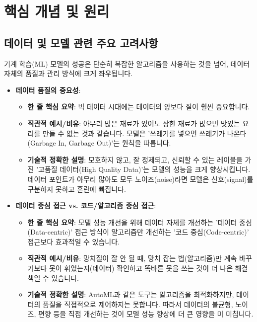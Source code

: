 \documentclass[11pt,a4paper]{article}
\begin{document}
\newpage
\section*{핵심 개념 및 원리}

\subsection*{데이터 및 모델 관련 주요 고려사항}

기계 학습(ML) 모델의 성공은 단순히 복잡한 알고리즘을 사용하는 것을 넘어, 데이터 자체의 품질과 관리 방식에 크게 좌우됩니다.

\begin{itemize}
    \item \textbf{데이터 품질의 중요성}:
    \begin{itemize}
        \item \textbf{한 줄 핵심 요약}: 빅 데이터 시대에는 데이터의 양보다 질이 훨씬 중요합니다.
        \item \textbf{직관적 예시/비유}: 아무리 많은 재료가 있어도 상한 재료가 많으면 맛있는 요리를 만들 수 없는 것과 같습니다. 모델은 '쓰레기를 넣으면 쓰레기가 나온다(Garbage In, Garbage Out)'는 원칙을 따릅니다.
        \item \textbf{기술적 정확한 설명}: 모호하지 않고, 잘 정제되고, 신뢰할 수 있는 레이블을 가진 '고품질 데이터(High Quality Data)'는 모델의 성능을 크게 향상시킵니다. 데이터 포인트가 아무리 많아도 모두 노이즈(noise)라면 모델은 신호(signal)를 구분하지 못하고 혼란에 빠집니다.
    \end{itemize}

    \item \textbf{데이터 중심 접근 vs. 코드/알고리즘 중심 접근}:
    \begin{itemize}
        \item \textbf{한 줄 핵심 요약}: 모델 성능 개선을 위해 데이터 자체를 개선하는 '데이터 중심(Data-centric)' 접근 방식이 알고리즘만 개선하는 '코드 중심(Code-centric)' 접근보다 효과적일 수 있습니다.
        \item \textbf{직관적 예시/비유}: 망치질이 잘 안 될 때, 망치 잡는 법(알고리즘)만 계속 바꾸기보다 못이 휘었는지(데이터) 확인하고 똑바른 못을 쓰는 것이 더 나은 해결책일 수 있습니다.
        \item \textbf{기술적 정확한 설명}: AutoML과 같은 도구는 알고리즘을 최적화하지만, 데이터의 품질을 직접적으로 제어하지는 못합니다. 따라서 데이터의 불균형, 노이즈, 편향 등을 직접 개선하는 것이 모델 성능 향상에 더 큰 영향을 미 미칩니다.
    \end{itemize}


\end{itemize}
\end{document}

